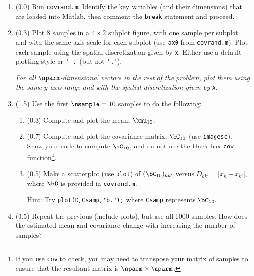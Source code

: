 \documentclass[11pt,titlepage,fleqn]{article}
\begin{document}
\begin{enumerate}

\item (0.0) Run \verb+covrand.m+. Identify the key variables (and their dimensions) that are loaded into Matlab, then comment the \verb+break+ statement and proceed.

\item (0.3) Plot 8 samples in a $4 \times 2$ subplot figure, with one sample per subplot and with the same axis scale for each subplot (use \verb+ax0+ from \verb+covrand.m+). Plot each sample using the spatial discretization given by \verb+x+. Either use a default plotting style or \verb+'-.'+(but not \verb+'.'+).

{\em For all $\nparm$-dimensional vectors in the rest of the problem, plot them using the same $y$-axis range and with the spatial discretization given by \verb+x+.}

\label{samps}


\item (1.5) Use the first $\nsample=10$ samples to do the following:
%
\begin{enumerate}
\item (0.3) Compute and plot the mean, $\bmu_{10}$.
\item (0.7) Compute and plot the covariance matrix, $\bC_{10}$ (use \verb+imagesc+). Show your code to compute $\bC_{10}$, and do not use the black-box \verb+cov+ function\footnote{If you use {\tt cov} to check, you may need to transpose your matrix of samples to ensure that the resultant matrix is $\nparm \times \nparm$.}.
\item (0.5) Make a scatterplot (use \verb+plot+) of $(\bC_{10})_{kk'}$ versus $D_{kk'} = |x_k - x_{k'}|$, where $\bD$ is provided in \verb+covrand.m+. 

Hint: Try \verb+plot(D,Csamp,'b.');+ where \verb+Csamp+ represents $\bC_{10}$.
\end{enumerate}


\item (0.5) Repeat the previous (include plots), but use all 1000 samples. How does the estimated mean and covariance change with increasing the number of samples?

\label{prob:Cd}



\end{enumerate}
\end{document}
